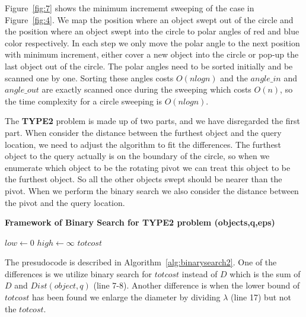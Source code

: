 \documentclass{sig-alternate}
\begin{document}
Figure~\ref{fig:7} shows the minimum incrememt sweeping of the case in Figure~\ref{fig:4}.
We map the position where an object swept out of the circle and the position where
an object swept into the circle to polar angles of red and blue color respectively.
In each step we only move the polar angle to the next position with minimum increment,
either cover a new object into the circle or pop-up the last object out of the circle.
The polar angles need to be sorted initially and be scanned one by one. 
Sorting these angles costs $O(nlogn)$ and the $angle\_in$ and $angle\_out$ are exactly
scanned once during the sweeping which costs $O(n)$, so the time complexity for a circle sweeping is $O(nlogn)$.

The \textbf{TYPE2} problem is made up of two parts, and we have disregarded the
first part. When consider the distance between the furthest object and the query location,
we need to adjust the algorithm to fit the differences. The furthest object to the
query actually is on the boundary of the circle, so when we enumerate which object
to be the rotating pivot we can treat this object to be the furthest object. So all
the other objects swept should be nearer than the pivot. When we perform the binary search
we also consider the distance between the pivot and the query location.

\begin{algorithm}[!ht]\small\label{alg:binarysearch2}
\caption{ \bf {Framework of Binary Search for TYPE2 problem} (objects,q,eps)}

$low \gets 0$\;
$high \gets \infty$\;
\Return $totcost$\;\vspace{-1ex}

\end{algorithm}

The presudocode is described in Algorithm~\ref{alg:binarysearch2}. One of the differences
is we utilize binary search for $totcost$ instead of $D$ which is the sum of $D$ and $Dist(object,q)$ (line 7-8).
Another difference is when the lower bound of $totcost$ has been found we enlarge the diameter by dividing $\lambda$ (line 17)
but not the $totcost$.
\end{document}

